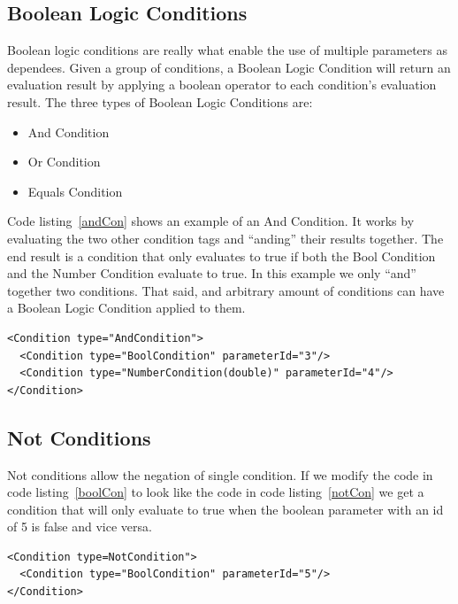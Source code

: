 \subsection{Boolean Logic Conditions}
Boolean logic conditions are really what enable the use of multiple parameters as dependees. Given a group of conditions, a Boolean Logic Condition will return an evaluation 
result by applying a boolean operator to each condition's evaluation result. The three types of Boolean Logic Conditions are:
\begin{itemize}
\item And Condition
\item Or Condition
\item Equals Condition
\end{itemize}

Code listing~\ref{andCon} shows an example of an And Condition. It works by evaluating the two other condition tags and ``anding'' their results together. The end result is a
condition that only evaluates to true if both the Bool Condition and the Number Condition evaluate to true. In this example we only ``and'' together two conditions. That said,
and arbitrary amount of conditions can have a Boolean Logic Condition applied to them.
\begin{lstlisting}[caption={Example of an And Condition}, label=andCon]
<Condition type="AndCondition">
  <Condition type="BoolCondition" parameterId="3"/>
  <Condition type="NumberCondition(double)" parameterId="4"/>
</Condition>
\end{lstlisting}

\subsection{Not Conditions}
Not conditions allow the negation of single condition. If we modify the code in code listing~\ref{boolCon} to look like the code in code listing~\ref{notCon} we get a 
condition that will only evaluate to true when the boolean parameter with an id of 5 is false and vice versa. 
\begin{lstlisting}[caption={Example of a Not Condition}, label=notCon]
<Condition type=NotCondition">
  <Condition type="BoolCondition" parameterId="5"/>
</Condition>
\end{lstlisting}

